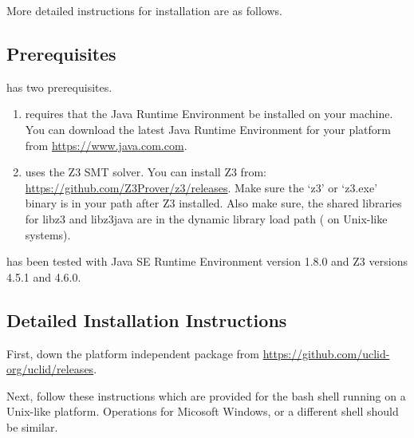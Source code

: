 More detailed instructions for installation are as follows.

\subsection{Prerequisites}

\uclid{} has two prerequisites. 
\begin{enumerate}
    \item \uclid{} requires that the Java\texttrademark{} Runtime Environment be installed on your machine. You can download the latest Java Runtime Environment for your platform from \url{https://www.java.com.com}. 
\item \uclid{} uses the Z3 SMT solver. You can install Z3 from: \url{https://github.com/Z3Prover/z3/releases}. Make sure the `z3' or `z3.exe' binary is in your path after Z3 installed. Also make sure, the shared libraries for libz3 and libz3java are in the dynamic library load path ( on Unix-like systems).
\end{enumerate}

\uclid{} has been tested with Java\texttrademark{} SE Runtime Environment version 1.8.0 and Z3 versions 4.5.1 and 4.6.0.

\subsection{Detailed Installation Instructions}

First, down the platform independent package from \url{https://github.com/uclid-org/uclid/releases}.

Next, follow these instructions which are provided for the bash shell running on a Unix-like platform. Operations for Micosoft Windows, or a different shell should be similar.

